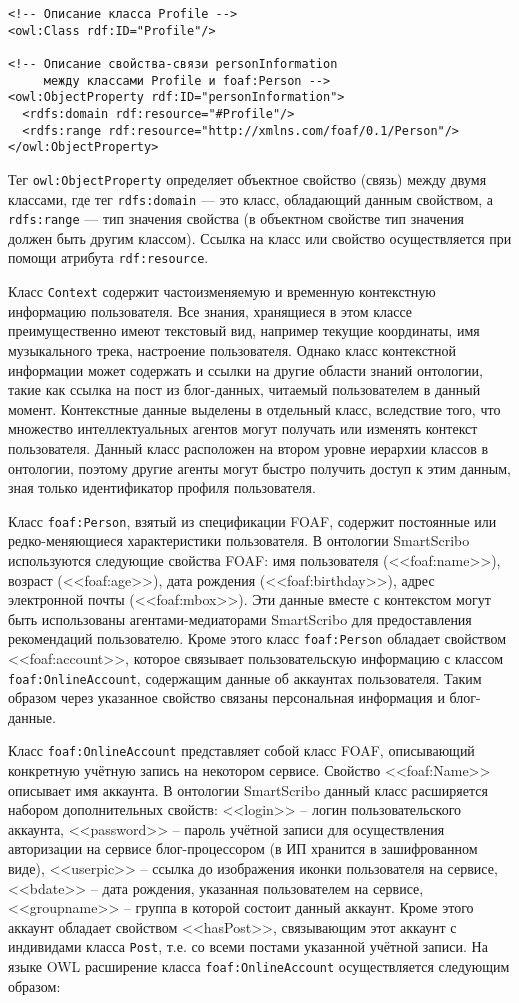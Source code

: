 {\small
\begin{verbatim}
<!-- Описание класса Profile -->
<owl:Class rdf:ID="Profile"/>

<!-- Описание свойства-связи personInformation 
     между классами Profile и foaf:Person -->
<owl:ObjectProperty rdf:ID="personInformation">
  <rdfs:domain rdf:resource="#Profile"/>
  <rdfs:range rdf:resource="http://xmlns.com/foaf/0.1/Person"/>
</owl:ObjectProperty>
\end{verbatim}
}
Тег {\tt owl:ObjectProperty} определяет объектное свойство (связь) между двумя классами, где тег {\tt rdfs:domain} --- это класс, обладающий данным свойством, а {\tt rdfs:range} --- тип значения свойства (в объектном свойстве тип значения должен быть другим классом). Ссылка на класс или свойство осуществляется при помощи атрибута {\tt rdf:resource}.

Класс {\tt Context} содержит частоизменяемую и временную контекстную информацию пользователя. Все знания, хранящиеся в этом классе преимущественно имеют текстовый вид, например текущие координаты, имя музыкального трека, настроение пользователя. Однако класс контекстной информации может содержать и ссылки на другие области знаний онтологии, такие как ссылка на пост из блог-данных, читаемый пользователем в данный момент. Контекстные данные выделены в отдельный класс, вследствие того, что множество интеллектуальных агентов могут получать или изменять контекст пользователя. Данный класс расположен на втором уровне иерархии классов в онтологии, поэтому другие агенты могут быстро получить доступ к этим данным, зная только идентификатор профиля пользователя.

Класс {\tt foaf:Person}, взятый из спецификации FOAF, содержит постоянные или редко-меняющиеся характеристики пользователя. В онтологии SmartScribo используются следующие свойства FOAF: имя пользователя (<<foaf:name>>), возраст (<<foaf:age>>), дата рождения (<<foaf:birthday>>), адрес электронной почты (<<foaf:mbox>>). Эти данные вместе с контекстом могут быть использованы агентами-медиаторами SmartScribo для предоставления рекомендаций пользователю. Кроме этого класс {\tt foaf:Person} обладает свойством <<foaf:account>>, которое связывает пользовательскую информацию с классом {\tt foaf:OnlineAccount}, содержащим данные об аккаунтах пользователя. Таким образом через указанное свойство связаны персональная информация и блог-данные.

Класс {\tt foaf:OnlineAccount} представляет собой класс FOAF, описывающий конкретную учётную запись на некотором сервисе. Свойство <<foaf:Name>> описывает имя аккаунта. В онтологии SmartScribo данный класс расширяется набором дополнительных свойств: <<login>> -- логин пользовательского аккаунта, <<password>> -- пароль учётной записи для осуществления авторизации на сервисе блог-процессором (в ИП хранится в зашифрованном виде), <<userpic>> -- ссылка до изображения иконки пользователя на сервисе, <<bdate>> -- дата рождения, указанная пользователем на сервисе, <<groupname>> -- группа в которой состоит данный аккаунт. Кроме этого аккаунт обладает свойством <<hasPost>>, связывающим этот аккаунт с индивидами класса {\tt Post}, т.е. со всеми постами указанной учётной записи. На языке OWL расширение класса {\tt foaf:OnlineAccount} осуществляется следующим образом:

